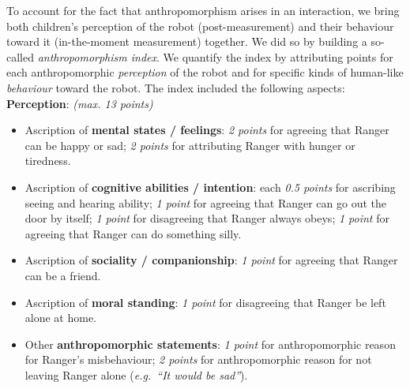 \documentclass[letterpaper, 10pt, conference]{ieeeconf}
\newcommand{\eg}{{\textit{e.g.~}}}
\begin{document}
%
To account for the fact that anthropomorphism arises in an interaction, we bring
both children's perception of the robot (post-measurement) and their behaviour
toward it (in-the-moment measurement) together. We did so by building a
so-called \emph{anthropomorphism index}. We quantify the
index by attributing points for each anthropomorphic \emph{perception} of the
robot and for specific kinds of human-like \emph{behaviour}
toward the robot. The index included the following aspects:\\

\textbf{Perception}: \textit{(max. 13 points)}

\begin{itemize}
    \item Ascription of \textbf{mental states / feelings}: \textit{2 points} for agreeing
            that Ranger can be happy or sad; \textit{2 points} for attributing Ranger with
        hunger or tiredness.

    \item Ascription of \textbf{cognitive abilities / intention}: each \textit{0.5
        points} for ascribing seeing and hearing ability; \textit{1 point} for agreeing
            that Ranger can go out the door by itself; \textit{1 point} for disagreeing that
            Ranger always obeys; \textit{1 point} for agreeing that Ranger can do something
        silly.

    \item Ascription of \textbf{sociality / companionship}: \textit{1 point} for agreeing
        that Ranger can be a friend.

    \item Ascription of \textbf{moral standing}: \textit{1 point} for disagreeing that
        Ranger be left alone at home.

    \item Other \textbf{anthropomorphic statements}: \textit{1 point} for anthropomorphic
        reason for Ranger's misbehaviour; \textit{2 points} for anthropomorphic reason
        for not leaving Ranger alone (\eg \textit{``It would be sad''}).

\end{itemize}
\end{document}
